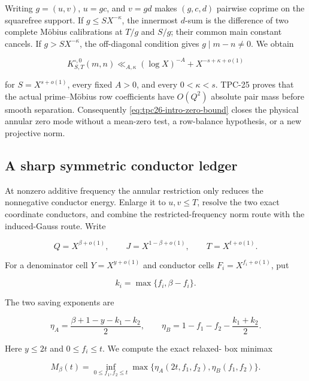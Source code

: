 Writing \(g=(u,v)\), \(u=gc\), and \(v=gd\) makes
\((g,c,d)\) pairwise coprime on the squarefree support.  If
\(g\le SX^{-\kappa}\), the innermost \(d\)-sum is the difference of
two complete M\"obius calibrations at \(T/g\) and \(S/g\); their common
main constant cancels.  If \(g>SX^{-\kappa}\), the off-diagonal
condition gives \(g\mid m-n\ne0\).  We obtain

\begin{equation}
 \boxed{
 K^{\square,0}_{S,T}(m,n)
 \ll_{A,\kappa}
 (\log X)^{-A}+X^{-s+\kappa+o(1)}}
 \label{eq:tpc26-intro-zero-bound}
\end{equation}

for \(S=X^{s+o(1)}\), every fixed \(A>0\), and every
\(0<\kappa<s\).  TPC-25 proves that the actual prime--M\"obius row
coefficients have \(O(Q^2)\) absolute pair mass before smooth
separation.  Consequently \eqref{eq:tpc26-intro-zero-bound} closes the
physical annular zero mode without a mean-zero test, a row-balance
hypothesis, or a new projective norm.

\subsection{A sharp symmetric conductor ledger}

At nonzero additive frequency the annular restriction only reduces the
nonnegative conductor energy.  Enlarge it to \(u,v\le T\), resolve the
two exact coordinate conductors, and combine the restricted-frequency
norm route with the induced-Gauss route.  Write

\begin{equation}
 Q=X^{\beta+o(1)},\qquad J=X^{1-\beta+o(1)},
 \qquad T=X^{t+o(1)}.
 \label{eq:tpc26-intro-exponents}
\end{equation}

For a denominator cell \(Y=X^{y+o(1)}\) and conductor cells
\(F_i=X^{f_i+o(1)}\), put

\[
 k_i=\max\{f_i,\beta-f_i\}.
\]

The two saving exponents are

\begin{equation}
 \eta_A=\frac{\beta+1-y-k_1-k_2}{2},
 \qquad
 \eta_B=1-f_1-f_2-\frac{k_1+k_2}{2}.
 \label{eq:tpc26-intro-etaAB}
\end{equation}

Here \(y\le2t\) and \(0\le f_i\le t\).  We compute the exact relaxed-
box minimax

\begin{equation}
 M_\beta(t)=
 \inf_{0\le f_1,f_2\le t}
 \max\{\eta_A(2t,f_1,f_2),\eta_B(f_1,f_2)\}.
 \label{eq:tpc26-intro-minimax}
\end{equation}

